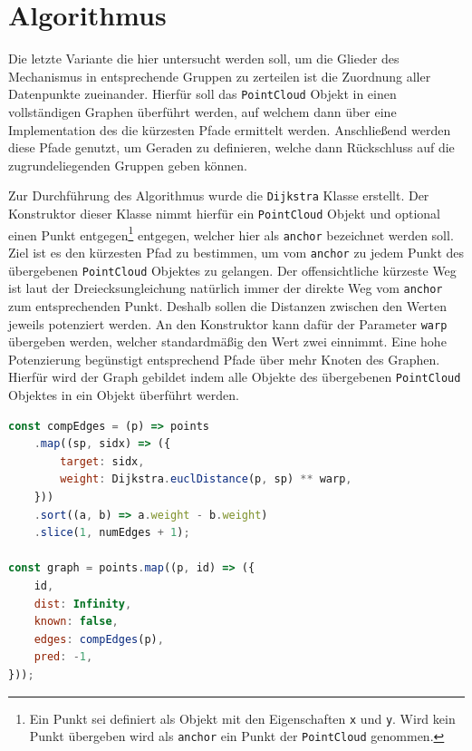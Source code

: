 \section{ Algorithmus}\label{ch:dijkstra}

Die letzte Variante die hier untersucht werden soll, um die Glieder des Mechanismus in entsprechende Gruppen zu zerteilen ist die Zuordnung aller Datenpunkte zueinander.
Hierfür soll das \lstinline{PointCloud} Objekt in einen vollständigen Graphen überführt werden, auf welchem dann über eine Implementation des  die kürzesten Pfade ermittelt werden.
Anschlie{\ss}end werden diese Pfade genutzt, um Geraden zu definieren, welche dann Rückschluss auf die zugrundeliegenden Gruppen geben können.

Zur Durchführung des  Algorithmus wurde die \lstinline{Dijkstra} Klasse erstellt.
Der Konstruktor dieser Klasse nimmt hierfür ein \lstinline{PointCloud} Objekt und optional einen Punkt entgegen\footnote{Ein Punkt sei definiert als Objekt mit den Eigenschaften \lstinline{x} und \lstinline{y}. Wird kein Punkt übergeben wird als \lstinline{anchor} ein Punkt der \lstinline{PointCloud} genommen.} entgegen, welcher hier als \lstinline{anchor} bezeichnet werden soll.
Ziel ist es den kürzesten Pfad zu bestimmen, um vom \lstinline{anchor} zu jedem Punkt des übergebenen \lstinline{PointCloud} Objektes zu gelangen.
Der offensichtliche kürzeste Weg ist laut der Dreiecksungleichung natürlich immer der direkte Weg vom \lstinline{anchor} zum entsprechenden Punkt.
Deshalb sollen die Distanzen zwischen den Werten jeweils potenziert werden.
An den Konstruktor kann dafür der Parameter \lstinline{warp} übergeben werden, welcher standardmä{\ss}ig den Wert zwei einnimmt.
Eine hohe Potenzierung begünstigt entsprechend Pfade über mehr Knoten des Graphen.
Hierfür wird der Graph gebildet indem alle Objekte des übergebenen \lstinline{PointCloud} Objektes in ein Objekt überführt werden.

\begin{lstlisting}[language=JavaScript, caption={Im \lstinline{Dijkstra} Konstruktor werden die Punkte des übergebenen \lstinline{PointCloud} Objektes in einen Graphen überführt.}, label={lst:dijkstra_points_graph}]
const compEdges = (p) => points
    .map((sp, sidx) => ({
        target: sidx,
        weight: Dijkstra.euclDistance(p, sp) ** warp,
    }))
    .sort((a, b) => a.weight - b.weight)
    .slice(1, numEdges + 1);

const graph = points.map((p, id) => ({
    id,
    dist: Infinity,
    known: false,
    edges: compEdges(p),
    pred: -1,
}));
\end{lstlisting}

